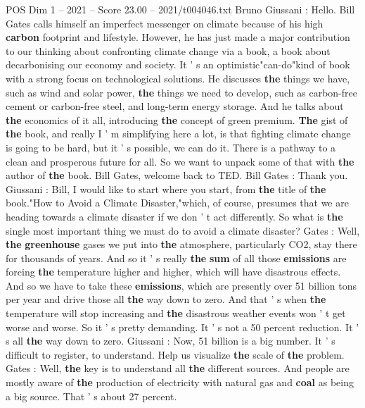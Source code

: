\begin{textsample}{POS Dim 1 – 2021 – Score 23.00 – 2021/t004046.txt}  \label{ex:f1_pos_061}
Bruno Giussani : Hello.
Bill Gates calls himself an imperfect messenger on climate because of his high \textbf{carbon} footprint and lifestyle.
However, he has just made a major contribution to our thinking about confronting climate change via a book, a book about decarbonising our economy and society.
It ' s an optimistic"can-do"kind of book with a strong focus on technological solutions.
He discusses \textbf{the} things we have, such as wind and solar power, \textbf{the} things we need to develop, such as carbon-free cement or carbon-free steel, and long-term energy storage.
And he talks about \textbf{the} economics of it all, introducing \textbf{the} concept of green premium. \textbf{The} gist of \textbf{the} book, and really I ' m simplifying here a lot, is that fighting climate change is going to be hard, but it ' s possible, we can do it.
There is a pathway to a clean and prosperous future for all.
So we want to unpack some of that with \textbf{the} author of \textbf{the} book.
Bill Gates, welcome back to TED.
Bill Gates : Thank you.
Giussani : Bill, I would like to start where you start, from \textbf{the} title of \textbf{the} book."How to Avoid a Climate Disaster,"which, of course, presumes that we are heading towards a climate disaster if we don ' t act differently.
So what is \textbf{the} single most important thing we must do to avoid a climate disaster?
Gates : Well, \textbf{the} \textbf{greenhouse} gases we put into \textbf{the} atmosphere, particularly CO2, stay there for thousands of years.
And so it ' s really \textbf{the} \textbf{sum} of all those \textbf{emissions} are forcing \textbf{the} temperature higher and higher, which will have disastrous effects.
And so we have to take these \textbf{emissions}, which are presently over 51 billion tons per year and drive those all \textbf{the} way down to zero.
And that ' s when \textbf{the} temperature will stop increasing and \textbf{the} disastrous weather events won ' t get worse and worse.
So it ' s pretty demanding.
It ' s not a 50 percent reduction.
It ' s all \textbf{the} way down to zero.
Giussani : Now, 51 billion is a big number.
It ' s difficult to register, to understand.
Help us visualize \textbf{the} scale of \textbf{the} problem.
Gates : Well, \textbf{the} key is to understand all \textbf{the} different sources.
And people are mostly aware of \textbf{the} production of electricity with natural gas and \textbf{coal} as being a big source.
That ' s about 27 percent.

\end{textsample}
